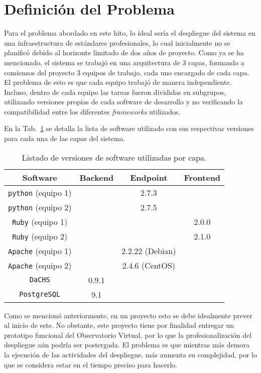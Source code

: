 \section{Definición del Problema}

Para el problema abordado en este hito, lo ideal sería el despliegue del sistema en una
infraestructura de estándares profesionales, lo cual inicialmente no se
planificó debido al horizonte limitado de dos años de proyecto.
Como ya se ha mencionado, el sistema se trabajó en una arquitectura de 3 capas,
formando a comienzos del proyecto 3 equipos de trabajo, cada uno encargado de
cada capa. El problema de esto es que cada equipo trabajó de manera
independiente. Incluso, dentro de cada equipo las tareas fueron divididas en
subgrupos, utilizando versiones propias de cada software de desarrollo y no
verificando la compatibilidad entre los diferentes \emph{frameworks} utilizados.

En la Tab.~\ref{tab:versiones} se detalla la lista de software utilizado con sus
respectivas versiones para cada una de las capas del sistema.

\begin{table}[ht!]
	\begin{center}
		\begin{tabular}{c|c|c|c}
			Software & Backend & Endpoint & Frontend \\\hline\hline
			\texttt{python} (equipo 1) &  & 2.7.3 &   \\\hline
			\texttt{python} (equipo 2) &  & 2.7.5 &   \\\hline
			\texttt{Ruby} (equipo 1) &  &  & 2.0.0  \\\hline
			\texttt{Ruby} (equipo 2) &  &  & 2.1.0  \\\hline
			\texttt{Apache} (equipo 1) &  & 2.2.22 (Debian) &   \\\hline
			\texttt{Apache} (equipo 2) &  & 2.4.6 (CentOS) &   \\\hline
			\texttt{DaCHS} & 0.9.1 &  &   \\\hline
			\texttt{PostgreSQL} & 9.1 &  &   \\
		\end{tabular}
	\end{center}
	\caption{Listado de versiones de software utilizadas por capa.}\label{tab:versiones}
\end{table}

Como se mencionó anteriormente, en un proyecto esto se debe idealmente 
prever al inicio de este. No obstante,
este proyecto tiene por finalidad entregar un prototipo funcional del
Observatorio Virtual, por lo que la profesionalización del despliegue aún podría
ser postergada. El problema es que mientras más demora la ejecución de las
actividades del despliegue, más aumenta su complejidad, por lo que se considera
estar en el tiempo preciso para hacerlo.


